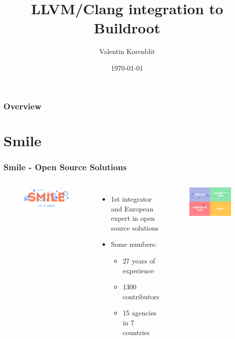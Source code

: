 \documentclass{smilebeamer}
\title[]{LLVM/Clang integration to Buildroot}
\author{Valentin Korenblit}
\institute[Smile]
{
ESIEE Paris \\~\\
\medskip
\textit{valentin.korenblit@smile.fr}
}
\date{\today}
\begin{document}
\begin{frame}
\titlepage
\end{frame}

\begin{frame}
\frametitle{Overview}
\tableofcontents
\end{frame}

\section{Smile}

\begin{frame}
\frametitle{Smile - Open Source Solutions}
\begin{columns}[c]
\begin{figure}
\includegraphics[width=0.6\linewidth]{img/smile.png}
\end{figure}
\begin{itemize}
  \item 1st integrator and European expert in open source solutions
  \item Some numbers:
  \begin{itemize}
    \item 27 years of experience
    \item 1300 contributors
    \item 15 agencies in 7 countries
  \end{itemize}
\end{itemize}
\begin{figure}[H]
\centering
  \includegraphics[scale=0.25]{img/smile_offers.png}
\end{figure}
\end{columns}
\end{frame}
\end{document}
